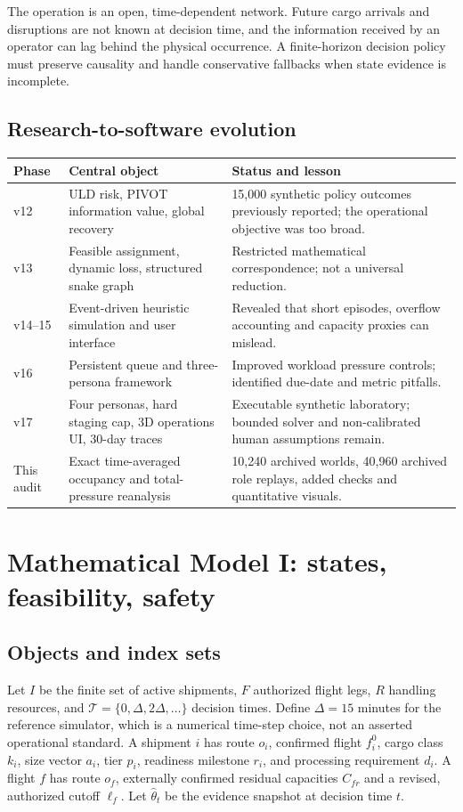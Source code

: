 \documentclass[10pt,a4paper]{article}
\theoremstyle{definition}\newtheorem{definition}[theorem]{Definition}
\theoremstyle{remark}\newtheorem{remark}[theorem]{Remark}
\newcommand{\1}{\mathbbm 1}
\begin{document}
The operation is an open, time-dependent network. Future cargo arrivals and disruptions are not known at decision time, and the information received by an operator can lag behind the physical occurrence. A finite-horizon decision policy must preserve causality and handle conservative fallbacks when state evidence is incomplete.

\subsection{Research-to-software evolution}
\begin{center}\small\begin{tabularx}{\linewidth}{@{}p{.10\linewidth}X X@{}}\toprule
Phase & Central object & Status and lesson\\\midrule
v12 & ULD risk, PIVOT information value, global recovery & 15,000 synthetic policy outcomes previously reported; the operational objective was too broad.\\
v13 & Feasible assignment, dynamic loss, structured snake graph & Restricted mathematical correspondence; not a universal reduction.\\
v14--15 & Event-driven heuristic simulation and user interface & Revealed that short episodes, overflow accounting and capacity proxies can mislead.\\
v16 & Persistent queue and three-persona framework & Improved workload pressure controls; identified due-date and metric pitfalls.\\
v17 & Four personas, hard staging cap, 3D operations UI, 30-day traces & Executable synthetic laboratory; bounded solver and non-calibrated human assumptions remain.\\
This audit & Exact time-averaged occupancy and total-pressure reanalysis & 10,240 archived worlds, 40,960 archived role replays, added checks and quantitative visuals.\\\bottomrule
\end{tabularx}\end{center}

\section{Mathematical Model I: states, feasibility, safety}
\subsection{Objects and index sets}
Let $I$ be the finite set of active shipments, $F$ authorized flight legs, $R$ handling resources, and $\mathcal T=\{0,\Delta,2\Delta,\ldots\}$ decision times. Define $\Delta=15$ minutes for the reference simulator, which is a numerical time-step choice, not an asserted operational standard. A shipment $i$ has route $o_i$, confirmed flight $f_i^0$, cargo class $k_i$, size vector $a_i$, tier $p_i$, readiness milestone $r_i$, and processing requirement $d_i$. A flight $f$ has route $o_f$, externally confirmed residual capacities $C_{fr}$ and a revised, authorized cutoff $\ell_f$. Let $\hat\theta_t$ be the evidence snapshot at decision time $t$.
\end{document}
